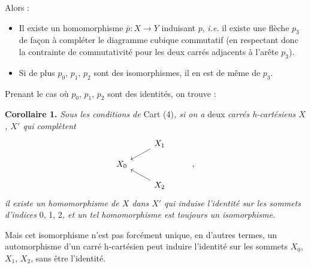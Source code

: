 Alors :
\begin{itemize}[leftmargin=2.5em]
\item[a)] Il existe un homomorphisme $\bar{p} : X \longrightarrow Y$ induisant $p$, \textit{i.e.} il existe une flèche $p_3$ de façon à compléter le diagramme cubique commutatif (en respectant donc la contrainte de commutativité pour les deux carrés adjacents à l'arête $p_3$).
\item[b)] Si de plus $p_0$, $p_1$, $p_2$ sont des isomorphismes, il en est de même de $p_3$.
\end{itemize}

Prenant le cas où $p_0$, $p_1$, $p_2$ sont des identités, on trouve :

\textbf{Corollaire 1.} \textit{Sous les conditions de} Cart (4)\textit{, si on a} deux \textit{carrés h-cartésiens $X$, $X'$ qui complètent}
\[
\begin{tikzcd}[row sep=small]
& X_1 \ar[dl] & \\
X_0 & & , \\
& X_2 \ar[ul] &
\end{tikzcd}
\]
\textit{il existe un homomorphisme de $X$ dans $X'$ qui induise l'identité sur les sommets d'indices} 0, 1, 2\textit{, et un tel homomorphisme est toujours un isomorphisme.}

Mais cet isomorphisme n'est pas forcément unique, en d'autres termes, un automorphisme d'un carré h-cartésien peut induire l'identité sur les sommets $X_0$, $X_1$, $X_2$, sans être l'identité.

